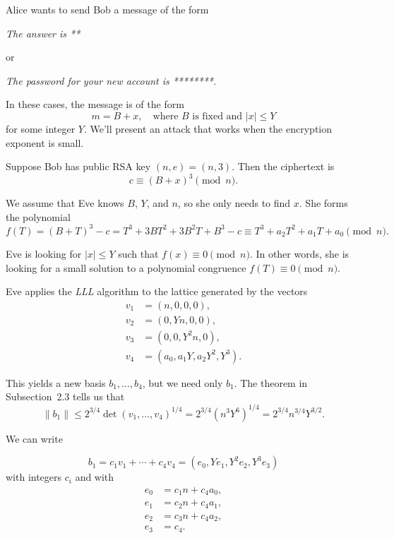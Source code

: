 \documentclass[a4paper,12pt]{article}
\begin{document}
Alice wants to send Bob a message of the form

\begin{center}
\textit{The answer is **}
\end{center}

or

\begin{center}
\textit{The password for your new account is ********.}
\end{center}

In these cases, the message is of the form
\[
m = B + x, \quad \text{where } B \text{ is fixed and } |x| \leq Y
\]
for some integer $Y$. We'll present an attack that works when the encryption exponent is small.


\medskip

Suppose Bob has public RSA key $(n,e) = (n,3)$. Then the ciphertext is
\[
c \equiv (B + x)^3 \pmod{n}.
\]

We assume that Eve knows $B$, $Y$, and $n$, so she only needs to find $x$. She forms the polynomial
\[
f(T) = (B + T)^3 - c = T^3 + 3BT^2 + 3B^2T + B^3 - c
\equiv T^3 + a_2 T^2 + a_1 T + a_0 \pmod{n}.
\]

Eve is looking for $|x| \leq Y$ such that $f(x) \equiv 0 \pmod{n}$. In other words, she is looking for a small solution to a polynomial congruence $f(T) \equiv 0 \pmod{n}$.

Eve applies the \textit{LLL} algorithm to the lattice generated by the vectors
\[
\begin{aligned}
v_1 &= (n, 0, 0, 0), \\
v_2 &= (0, Yn, 0, 0), \\
v_3 &= (0, 0, Y^2n, 0), \\
v_4 &= (a_0, a_1Y, a_2Y^2, Y^3).
\end{aligned}
\]

This yields a new basis $b_1, \dots, b_4$, but we need only $b_1$. The theorem in Subsection~2.3 tells us that
\[
\|b_1\| \leq 2^{3/4} \det(v_1,\dots,v_4)^{1/4}
= 2^{3/4}(n^3Y^6)^{1/4} = 2^{3/4}n^{3/4}Y^{3/2}. \tag{17.3}
\]

We can write

\[
b_1 = c_1v_1 + \cdots + c_4v_4 = (e_0, Y e_1, Y^2 e_2, Y^3 e_3)
\]
with integers $c_i$ and with
\[
\begin{aligned}
e_0 &= c_1 n + c_4 a_0, \\
e_1 &= c_2 n + c_4 a_1, \\
e_2 &= c_3 n + c_4 a_2, \\
e_3 &= c_4.
\end{aligned}
\]
\end{document}
